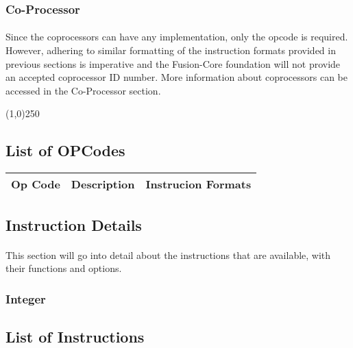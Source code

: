 \documentclass[letterpaper, 11pt]{article}
\begin{document}
\subsubsection{Co-Processor}

\paragraph{}Since the coprocessors can have any implementation, only the opcode is required. However, adhering to similar formatting of the instruction formats provided in previous sections is imperative and the Fusion-Core foundation will not provide an accepted coprocessor ID number. More information about coprocessors can be accessed in the Co-Processor section.
\begin{center}
	\line(1,0){250}
\end{center}

\newpage
\subsection{List of OPCodes}
	\begin{center}
		\begin{tabular}{|c|c|c|}
			Op Code & Description & Instrucion Formats \\ \hline
		\end{tabular}
	\end{center}

\newpage
\subsection{Instruction Details}
\paragraph{}This section will go into detail about the instructions that are available, with their functions and options.\\
\subsubsection{Integer}

\subsection{List of Instructions}
\end{document}
